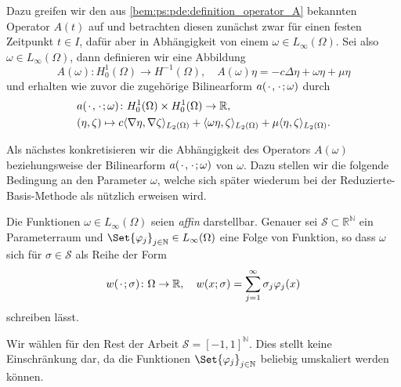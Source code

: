 Dazu greifen wir den aus \cref{bem:ps:pde:definition_operator_A} bekannten Operator $A(t)$ auf und betrachten diesen zunächst zwar für einen festen Zeitpunkt $t \in I$, dafür aber in Abhängigkeit von einem $\omega \in L_{\infty}(\Omega)$.
Sei also $\omega \in L_{\infty}(\Omega)$, dann definieren wir eine Abbildung
\begin{equation}
    \label{eq:ps:pf:operator_A}
    A(\omega) \colon H^{1}_{0}(\Omega) \to H^{-1}(\Omega), \quad A(\omega) \eta = - c \Delta \eta + \omega \eta + \mu \eta
\end{equation}
und erhalten wie zuvor die zugehörige Bilinearform $a({\mkern2mu\cdot\mkern2mu}, {\mkern2mu\cdot\mkern2mu}; \omega)$ durch
\begin{equation}
    \label{eq:ps:pf:bilinearform_a}
    \begin{aligned}
        &a({\mkern2mu\cdot\mkern2mu}, {\mkern2mu\cdot\mkern2mu}; \omega) \colon H^{1}_{0}(\Omega) \times H^{1}_{0}(\Omega) \to \mathbb{R}, \\
        &(\eta, \zeta) \mapsto c\langle\nabla \eta,\nabla \zeta\rangle_{L_{2}(\Omega)} + \langle\omega \eta,\zeta\rangle_{L_{2}(\Omega)} + \mu \langle\eta,\zeta\rangle_{L_{2}(\Omega)}.
    \end{aligned}
\end{equation}

Als nächstes konkretisieren wir die Abhängigkeit des Operators $A(\omega)$ beziehungsweise der Bilinearform $a({\mkern2mu\cdot\mkern2mu}, {\mkern2mu\cdot\mkern2mu}; \omega)$ von $\omega$.
Dazu stellen wir die folgende Bedingung an den Parameter $\omega$, welche sich später wiederum bei der Reduzierte-Basis-Methode als nützlich erweisen wird.

\begin{Definition}
\label{def:ps:pf:omega_affin}
    Die Funktionen $\omega \in L_{\infty}(\Omega)$ seien \emph{affin} darstellbar.
    Genauer sei $\mathcal S \subset \mathbb{R}^{\mathbb{N}}$ ein Parameterraum und $\Set{ \varphi_{j} }_{j \in \mathbb{N}} \in L_{\infty}(\Omega)$ eine Folge von Funktion, so dass $\omega$ sich für $\sigma \in \mathcal S$ als Reihe der Form
    \begin{equation}
    \label{eq:ps:pf:omega_affine_zerlegung}
        w({\mkern2mu\cdot\mkern2mu}; \sigma) \colon \Omega \to \mathbb{R}, \quad w(x; \sigma) = \sum_{j = 1}^{\infty} \sigma_{j} \varphi_{j}(x)
    \end{equation}
    schreiben lässt.
\end{Definition}

\begin{Bemerkung}
    Wir wählen für den Rest der Arbeit $\mathcal S = [-1, 1]^{\mathbb{N}}$.
    Dies stellt keine Einschränkung dar, da die Funktionen $\Set{ \varphi_{j} }_{j \in \mathbb{N}}$ beliebig umskaliert werden können.
\end{Bemerkung}


